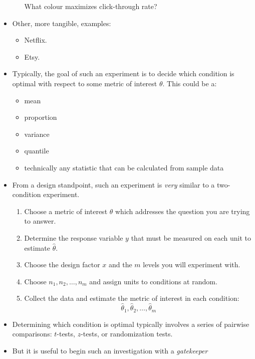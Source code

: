 \begin{itemize}
\begin{itemize}
                    What colour maximizes click-through rate?
          \end{itemize}
    \item Other, more tangible, examples:
          \begin{itemize}
              \item Netflix.
              \item Etsy.
          \end{itemize}
    \item Typically, the goal of such an experiment is to decide which condition is
          optimal with respect to some metric of interest $ \theta $. This could be a:
          \begin{itemize}
              \item mean
              \item proportion
              \item variance
              \item quantile
              \item technically any statistic that can be calculated from sample data
          \end{itemize}
    \item From a design standpoint, such an experiment is \emph{very} similar to
          a two-condition experiment.
          \begin{enumerate}
              \item Choose a metric of interest $ \theta $ which addresses the question
                    you are trying to answer.
              \item Determine the response variable $ y $ that must be measured on each
                    unit to estimate $ \hat{\theta} $.
              \item Choose the design factor $ x $ and the $ m $ levels you will experiment with.
              \item Choose $ n_1,n_2,\ldots,n_m $ and assign units to conditions at random.
              \item Collect the data and estimate the metric of interest in each condition:
                    \[ \hat{\theta}_1,\hat{\theta}_2,\ldots,\hat{\theta}_m \]
          \end{enumerate}
    \item Determining which condition is optimal typically involves a series of pairwise
          comparisons: $ t $-tests, $ z $-tests, or randomization tests.
    \item But it is useful to begin such an investigation with a \emph{gatekeeper}

\end{itemize}
